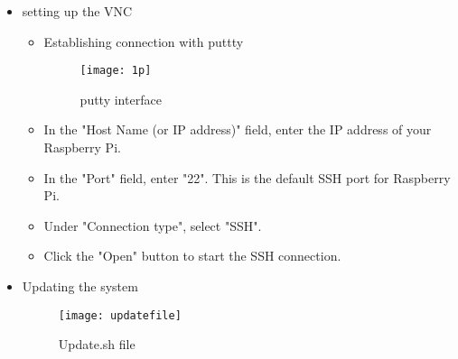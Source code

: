 \begin{itemize}
\item{setting up the VNC}
\begin{itemize}
\item{Establishing connection with puttty}
\FloatBarrier
\begin{figure}[h]

       \centering

        \texttt{[image: 1p]}
   
        \caption{putty interface}
        \label{fig:putty interface}

    \end{figure}

\FloatBarrier
\end{itemize}
\begin{itemize}
\item In the "Host Name (or IP address)" field, enter the IP address of your Raspberry Pi.
\item In the "Port" field, enter "22". This is the default SSH port for Raspberry Pi.
\item Under "Connection type", select "SSH".
\item Click the "Open" button to start the SSH connection.
\end{itemize}
\item{Updating the system}
\FloatBarrier
\begin{figure}[h]

       \centering

        \texttt{[image: updatefile]}
   
        \caption{Update.sh file}
        \label{fig:update.sh}

    \end{figure}


\end{itemize}
